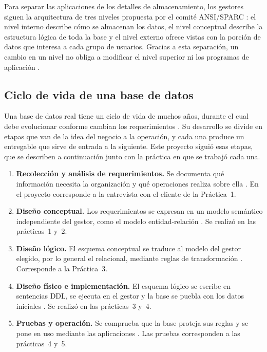 Para separar las aplicaciones de los detalles de almacenamiento, los gestores siguen la arquitectura de tres niveles propuesta por el comité ANSI/SPARC \parencite[pp.~36--37]{elmasri_navathe}: el nivel interno describe cómo se almacenan los datos, el nivel conceptual describe la estructura lógica de toda la base y el nivel externo ofrece vistas con la porción de datos que interesa a cada grupo de usuarios. Gracias a esta separación, un cambio en un nivel no obliga a modificar el nivel superior ni los programas de aplicación \parencite[pp.~37--38]{elmasri_navathe}.

\subsection{Ciclo de vida de una base de datos}

Una base de datos real tiene un ciclo de vida de muchos años, durante el cual debe evolucionar conforme cambian los requerimientos \parencite[p.~8]{elmasri_navathe}. Su desarrollo se divide en etapas que van de la idea del negocio a la operación, y cada una produce un entregable que sirve de entrada a la siguiente. Este proyecto siguió esas etapas, que se describen a continuación junto con la práctica en que se trabajó cada una.

\begin{enumerate}[label=\arabic*.]
    \item \textbf{Recolección y análisis de requerimientos.} Se documenta qué información necesita la organización y qué operaciones realiza sobre ella \parencite[p.~8]{elmasri_navathe}. En el proyecto corresponde a la entrevista con el cliente de la Práctica~1.
    \item \textbf{Diseño conceptual.} Los requerimientos se expresan en un modelo semántico independiente del gestor, como el modelo entidad-relación \parencite[pp.~9--10]{chen_er_model}. Se realizó en las prácticas~1 y~2.
    \item \textbf{Diseño lógico.} El esquema conceptual se traduce al modelo del gestor elegido, por lo general el relacional, mediante reglas de transformación \parencite[p.~289]{elmasri_navathe}. Corresponde a la Práctica~3.
    \item \textbf{Diseño físico e implementación.} El esquema lógico se escribe en sentencias DDL, se ejecuta en el gestor y la base se puebla con los datos iniciales \parencites[p.~41]{date_intro_bd}[p.~31]{elmasri_navathe}. Se realizó en las prácticas~3 y~4.
    \item \textbf{Pruebas y operación.} Se comprueba que la base proteja sus reglas y se pone en uso mediante las aplicaciones \parencite[pp.~43--45]{elmasri_navathe}. Las pruebas corresponden a las prácticas~4 y~5.
\end{enumerate}

